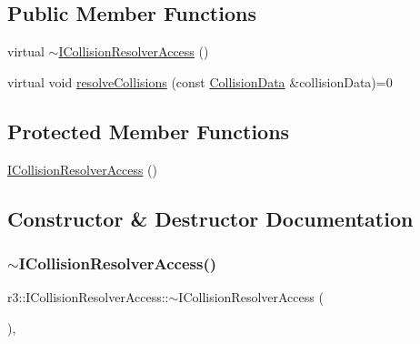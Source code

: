 \subsection*{Public Member Functions}
\begin{DoxyCompactItemize}
\item 
virtual \mbox{\hyperlink{classr3_1_1_i_collision_resolver_access_a56e8e69db0a57cb22e3c8defa8502b30}{$\sim$\+I\+Collision\+Resolver\+Access}} ()
\item 
virtual void \mbox{\hyperlink{classr3_1_1_i_collision_resolver_access_a9f7d7bdd46fa4448b3acc5e79a3c724b}{resolve\+Collisions}} (const \mbox{\hyperlink{classr3_1_1_collision_data}{Collision\+Data}} \&collision\+Data)=0
\end{DoxyCompactItemize}
\subsection*{Protected Member Functions}
\begin{DoxyCompactItemize}
\item 
\mbox{\hyperlink{classr3_1_1_i_collision_resolver_access_ade62636ccefb20b027eef0ff272d6d48}{I\+Collision\+Resolver\+Access}} ()
\end{DoxyCompactItemize}


\subsection{Constructor \& Destructor Documentation}
\mbox{\label{classr3_1_1_i_collision_resolver_access_a56e8e69db0a57cb22e3c8defa8502b30}} 
\subsubsection{\texorpdfstring{$\sim$\+I\+Collision\+Resolver\+Access()}{~ICollisionResolverAccess()}}
{\footnotesize\ttfamily r3\+::\+I\+Collision\+Resolver\+Access\+::$\sim$\+I\+Collision\+Resolver\+Access (\begin{DoxyParamCaption}{ }\end{DoxyParamCaption})\hspace{0.3cm}{\ttfamily [virtual]}, {\ttfamily [default]}}

